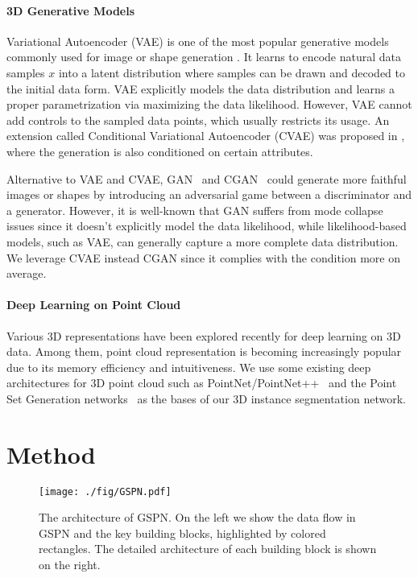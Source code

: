 \documentclass[10pt,twocolumn,letterpaper]{article}
\begin{document}
\paragraph{3D Generative Models}
Variational Autoencoder (VAE) \cite{kingma2013auto} is one of the most popular generative models commonly used for image or shape generation \cite{gulrajani2016pixelvae, nash2017shape}. It learns to encode natural data samples $x$ into a latent distribution where samples can be drawn and decoded to the initial data form. VAE explicitly models the data distribution and learns a proper parametrization via maximizing the data likelihood. However, VAE cannot add controls to the sampled data points, which usually restricts its usage. An extension called Conditional Variational Autoencoder (CVAE) was proposed in \cite{sohn2015learning}, where the generation is also conditioned on certain attributes. 





Alternative to VAE and CVAE, GAN~\cite{goodfellow2014generative} and CGAN~\cite{mirza2014conditional} could generate more faithful images or shapes by introducing an adversarial game between a discriminator and a generator. However, it is well-known that GAN suffers from mode collapse issues since it doesn't explicitly model the data likelihood, while likelihood-based models, such as VAE, can generally capture a more complete data distribution. We leverage CVAE instead CGAN since it complies with the condition more on average.

\vspace{-\baselineskip}
\paragraph{Deep Learning on Point Cloud}
Various 3D representations \cite{su2015multi, wu20153d, riegler2017octnet, yi2017syncspeccnn, qi2017pointnet, qi2017pointnet++, fan2017point} have been explored recently for deep learning on 3D data. Among them, point cloud representation is becoming increasingly popular due to its memory efficiency and intuitiveness. We use some existing deep architectures for 3D point cloud such as PointNet/PointNet++~\cite{qi2017pointnet,qi2017pointnet++} and the Point Set Generation networks~\cite{fan2017point} as the bases of our 3D instance segmentation network.


%
 
\section{Method}
\begin{figure*}[t!]
    \centering
    \texttt{[image: ./fig/GSPN.pdf]}
    \caption{The architecture of GSPN. On the left we show the data flow in GSPN and the key building blocks, highlighted by colored rectangles. The detailed architecture of each building block is shown on the right.}
    \label{fig:gspn}
    \vspace{-\baselineskip}
\end{figure*}
\end{document}
